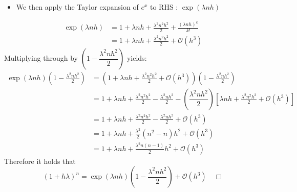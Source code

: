 \documentclass[]{article}
\begin{document}
\begin{itemize}
    \item We then apply the Taylor expansion of $e^x$ to RHS : $\exp(\lambda n h)$
\end{itemize}
\begin{align*}
    \exp(\lambda n h) &= 1 + \lambda n h + \frac{\lambda^2 n^2 h^2}{2}  +\frac{(\lambda n h)^k}{k!}\\
     &= 1 + \lambda n h + \frac{\lambda^2 n^2 h^2}{2}  + \mathcal{O}(h^3)
\end{align*}
\noindent Multiplying through by $\left(1-\dfrac{\lambda^2 n h^2}{2}\right)$ yields:
\[
\begin{aligned}
\exp(\lambda n h)\left(1-\frac{\lambda^2 n h^2}{2}\right)
&= \left(1 + \lambda n h + \frac{\lambda^2 n^2 h^2}{2} + \mathcal{O}(h^3)\right)
   \left(1-\frac{\lambda^2 n h^2}{2}\right)\\[4pt]
&= 1 + \lambda n h + \frac{\lambda^2 n^2 h^2}{2}
   - \frac{\lambda^2 n h^2}{2} - \left(\dfrac{\lambda^2 n h^2}{2}\right)\left[ \lambda n h + \frac{\lambda^2 n^2 h^2}{2} + \mathcal{O}(h^3)\right]\\[4pt]
&=  1 + \lambda n h + \frac{\lambda^2 n^2 h^2}{2}
   - \frac{\lambda^2 n h^2}{2} + \mathcal{O}(h^3) \\[4pt]
&= 1 + \lambda n h + \frac{\lambda^2}{2}\left(n^2 - n\right)h^2 + \mathcal{O}(h^3)\\[4pt]
&= 1 + \lambda n h + \frac{\lambda^2 n(n-1)}{2}h^2 + \mathcal{O}(h^3)
\end{aligned}
\]
\noindent Therefore it holds that 
\[
(1+h\lambda)^n = \exp(\lambda n h)\left(1-\frac{\lambda^2 n h^2}{2}\right)+\mathcal{O}(h^3) \quad \Box
\]

\hrulefill
\end{document}
